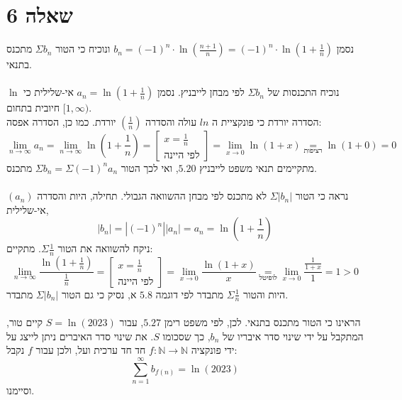 \documentclass{article}
\newcommand\underrel[2]{\mathrel{\mathop{#2}\limits_{#1}}}
\begin{document}
\pagebreak

\section*{שאלה 6}

נסמן $b_n=(-1)^n\cdot \ln(\frac{n+1}{n})=(-1)^n\cdot \ln(1+\frac{1}{n})$
ונוכיח כי הטור $\Sigma b_n$ מתכנס בתנאי.
\\\\
נוכיח התכנסות של $\Sigma b_n$ לפי מבחן לייבניץ.
נסמן $a_n=\ln(1+\frac{1}{n})$ אי-שלילית כי $\ln$ חיובית בתחום $[1,\infty)$. \\
הסדרה יורדת כי פונקציית ה $ln$ עולה והסדרה $(\frac{1}{n})$ יורדת. כמו כן, הסדרה אפסה:
\[
    \lim_{n\rightarrow\infty}a_n=
    \lim_{n\rightarrow\infty} \ln(1+\frac{1}{n}) =
    \begin{bmatrix}
        x=\frac{1}{n} \\
        \text{לפי היינה}
    \end{bmatrix}=
    \lim_{x\rightarrow 0} \ln(1+x) \underrel{\text{רציפות}}{=}
    \ln(1+0)=0
\]
מתקיימים תנאי משפט לייבניץ $5.20$, ואי לכך הטור $\Sigma b_n=\Sigma (-1)^n a_n$ מתכנס.
\\\\
נראה כי הטור $\Sigma|b_n|$ לא מתכנס לפי מבחן ההשוואה הגבולי. תחילה, היות והסדרה $(a_n)$ אי-שלילית,
\[
    |b_n|=|(-1)^n||a_n|=a_n=\ln(1+\frac{1}{n})
\]
ניקח להשוואה את הטור $\Sigma \frac{1}{n}$. מתקיים:
\[
    \lim_{n\rightarrow\infty} \frac{\ln(1+\frac{1}{n})}{\frac{1}{n}} =
    \begin{bmatrix}
        x=\frac{1}{n} \\
        \text{לפי היינה}
    \end{bmatrix} =
    \lim_{x\rightarrow 0} \frac{\ln(1+x)}{x} \underrel{\text{לופיטל}}{=}
    \lim_{x\rightarrow 0} \frac{\frac{1}{1+x}}{1} = 1>0
\]
היות והטור $\Sigma \frac{1}{n}$ מתבדר לפי דוגמה $5.8$ א, נסיק כי גם הטור $\Sigma |b_n|$ מתבדר.
\\\\
הראינו כי הטור מתכנס בתנאי. לכן, לפי משפט רימן $5.27$,
עבור $S=\ln(2023)$ קיים טור, המתקבל על ידי שינוי סדר איבריו של $b_n$, כך שסכומו $S$.
את שינוי סדר האיברים ניתן לייצג על ידי פונקציה $f:\mathbb{N}\rightarrow\mathbb{N}$ חד חד ערכית ועל, ולכן עבור $f$ נקבל:
\[
    \sum_{n=1}^\infty b_{f(n)}=\ln(2023)
\]
וסיימנו.
\end{document}
